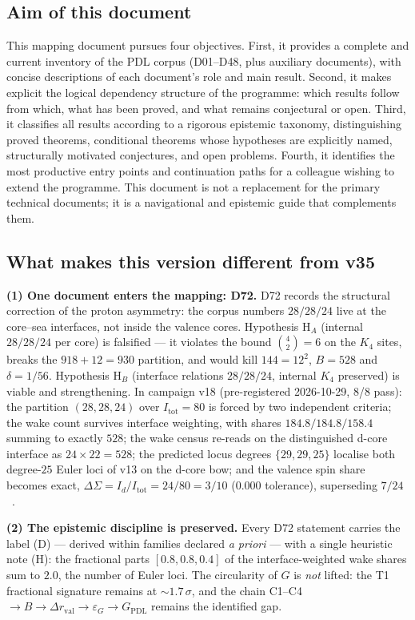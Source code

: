 \documentclass[11pt,a4paper]{article}
\theoremstyle{plain}
\theoremstyle{definition}
\theoremstyle{remark}
\begin{document}
\subsection{Aim of this document}
\label{subsec:aim}
This mapping document pursues four objectives. First, it provides a complete and current inventory of the PDL corpus (D01--D48, plus auxiliary documents), with concise descriptions of each document's role and main result. Second, it makes explicit the logical dependency structure of the programme: which results follow from which, what has been proved, and what remains conjectural or open. Third, it classifies all results according to a rigorous epistemic taxonomy, distinguishing proved theorems, conditional theorems whose hypotheses are explicitly named, structurally motivated conjectures, and open problems. Fourth, it identifies the most productive entry points and continuation paths for a colleague wishing to extend the programme. This document is not a replacement for the primary technical documents; it is a navigational and epistemic guide that complements them.

\subsection{What makes this version different from v35}

\textbf{(1) One document enters the mapping: D72.} D72 records the structural correction of the proton asymmetry: the corpus numbers $28/28/24$ live at the core--sea interfaces, not inside the valence cores. Hypothesis H$_{A}$ (internal $28/28/24$ per core) is falsified --- it violates the bound $\binom{4}{2}=6$ on the $K_{4}$ sites, breaks the $918+12=930$ partition, and would kill $144=12^{2}$, $B=528$ and $\delta=1/56$. Hypothesis H$_{B}$ (interface relations $28/28/24$, internal $K_{4}$ preserved) is viable and strengthening. In campaign v18 (pre-registered 2026-10-29, 8/8 pass): the partition $(28,28,24)$ over $I_{\mathrm{tot}}=80$ is forced by two independent criteria; the wake count survives interface weighting, with shares $184.8/184.8/158.4$ summing to exactly $528$; the wake census re-reads on the distinguished d-core interface as $24\times22=528$; the predicted locus degrees $\{29,29,25\}$ localise both degree-$25$ Euler loci of v13 on the d-core bow; and the valence spin share becomes exact, $\Delta\Sigma=I_{d}/I_{\mathrm{tot}}=24/80=3/10$ ($0.000$ tolerance), superseding $7/24$~\cite{D72}.

\textbf{(2) The epistemic discipline is preserved.} Every D72 statement carries the label (D) --- derived within families declared \emph{a priori} --- with a single heuristic note (H): the fractional parts $[0.8,0.8,0.4]$ of the interface-weighted wake shares sum to $2.0$, the number of Euler loci. \textcolor{negativered}{The circularity of $G$ is \emph{not} lifted}: the T1 fractional signature remains at $\sim1.7\,\sigma$, and the chain C1--C4 $\to B\to\Delta r_{\mathrm{val}}\to\varepsilon_{G}\to G_{\mathrm{PDL}}$ remains the identified gap.
\end{document}
